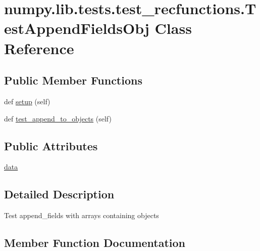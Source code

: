 \hypertarget{classnumpy_1_1lib_1_1tests_1_1test__recfunctions_1_1TestAppendFieldsObj}{}\section{numpy.\+lib.\+tests.\+test\+\_\+recfunctions.\+Test\+Append\+Fields\+Obj Class Reference}
\label{classnumpy_1_1lib_1_1tests_1_1test__recfunctions_1_1TestAppendFieldsObj}
\subsection*{Public Member Functions}
\begin{DoxyCompactItemize}
\item 
def \hyperlink{classnumpy_1_1lib_1_1tests_1_1test__recfunctions_1_1TestAppendFieldsObj_aeaee2fd69d3e3d306531b3281793a6b8}{setup} (self)
\item 
def \hyperlink{classnumpy_1_1lib_1_1tests_1_1test__recfunctions_1_1TestAppendFieldsObj_aa7f9ba1261e57c33a0a051ca35f2b514}{test\+\_\+append\+\_\+to\+\_\+objects} (self)
\end{DoxyCompactItemize}
\subsection*{Public Attributes}
\begin{DoxyCompactItemize}
\item 
\hyperlink{classnumpy_1_1lib_1_1tests_1_1test__recfunctions_1_1TestAppendFieldsObj_aee35526634d8d8e9c1c5e6172a6167b3}{data}
\end{DoxyCompactItemize}


\subsection{Detailed Description}
\begin{DoxyVerb}Test append_fields with arrays containing objects
\end{DoxyVerb}
 

\subsection{Member Function Documentation}
\mbox{\label{classnumpy_1_1lib_1_1tests_1_1test__recfunctions_1_1TestAppendFieldsObj_aeaee2fd69d3e3d306531b3281793a6b8}} 
